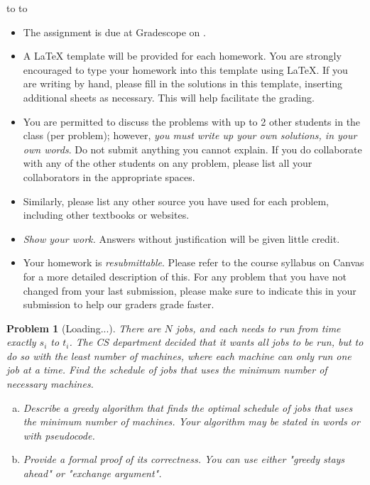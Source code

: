\documentclass[10pt]{article}
\newcommand{\handout}{
   \renewcommand{\thepage}{H\hnumber-\arabic{page}}
   \noindent
   \begin{center}
      \vbox{
    \hbox to \columnwidth {\sc{\course} --- \prof \hfill}
    \vspace{-2mm}
    \hbox to \columnwidth {\sc due \MakeLowercase{\duedate} \duelocation\hfill {\Huge\color{mdb}H\hnumber.\yourname}}
      }
   \end{center}
   \vspace*{2mm}
}
\newtheorem{problem}{\sc\color{cit}Problem}
\begin{document}
\handout
\begin{itemize}
\item The assignment is due at Gradescope on \duedate.

\item A LaTeX template will be provided for each homework. You are strongly encouraged to type your homework into this template using \LaTeX.  If you are writing by hand, please fill in the solutions in this template, inserting additional sheets as necessary. This will help facilitate the grading.

\item You are permitted to discuss the problems with up to 2 other students in the class (per problem); however, {\em you must write up your own solutions, in your own words}. Do not submit anything you cannot explain. If you do collaborate with any of the other students on any problem, please list all your collaborators in the appropriate spaces.

\item Similarly, please list any other source you have used for each problem, including other textbooks or websites.

\item {\em Show your work.} Answers without justification will be given little credit.

\item Your homework is \textit{resubmittable}. Please refer to the course syllabus on Canvas for a more detailed description of this. For any problem that you have not changed from your last submission, please make sure to indicate this in your submission to help our graders grade faster. 

\end{itemize}

\newpage



\begin{problem}[Loading...]
There are $N$ jobs, and each needs to run from time exactly $s_i$ to $t_i$. The CS department decided that it wants all jobs to be run, but to do so with the least number of machines, where each machine can only run one job at a time. Find the schedule of jobs that uses the minimum number of necessary machines.
\begin{enumerate}[(a)]
    \item Describe a greedy algorithm that finds the optimal schedule of jobs that uses the minimum number of machines. Your algorithm may be stated in words or with pseudocode.
    \item Provide a formal proof of its correctness. You can use either "greedy stays ahead" or "exchange argument".
\end{enumerate}
\end{problem}
\end{document}
